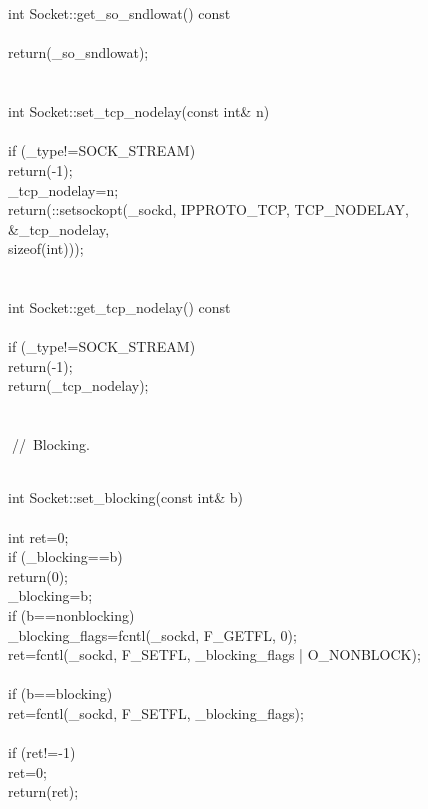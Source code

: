 \documentclass{article}
\begin{document}
\\
 
\\
 int Socket::get_so_sndlowat() const
\\
 {
\\
         return(_so_sndlowat);
\\
 }
\\
 
\\
 int Socket::set_tcp_nodelay(const int& n)
\\
 {
\\
     if (_type!=SOCK_STREAM)
\\
         return(-1);
\\
     _tcp_nodelay=n;
\\
     return(::setsockopt(_sockd, IPPROTO_TCP, TCP_NODELAY, &_tcp_nodelay,
\\
             sizeof(int)));
\\
 }
\\
 
\\
 int Socket::get_tcp_nodelay() const
\\
 {
\\
     if (_type!=SOCK_STREAM)
\\
         return(-1);
\\
     return(_tcp_nodelay);
\\
 }
\\
 
\\
 
\hbox{// Blocking.}\strut\\
 int Socket::set_blocking(const int& b)
\\
 {
\\
         int ret=0;
\\
         if (_blocking==b)
\\
                 return(0);
\\
         _blocking=b;
\\
         if (b==nonblocking) {
\\
                 _blocking_flags=fcntl(_sockd, F_GETFL, 0);
\\
                 ret=fcntl(_sockd, F_SETFL, _blocking_flags | O_NONBLOCK);
\\
         } 
\\
         if (b==blocking) {
\\
                 ret=fcntl(_sockd, F_SETFL, _blocking_flags);
\\
         }
\\
         if (ret!=-1)
\\
                 ret=0;
\\
         return(ret);    
\\
 }
\end{document}
